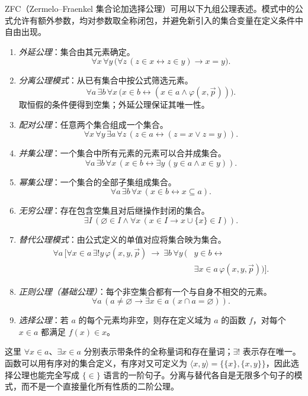 \documentclass[lang=cn,a4paper,fontset=none,zihao=false,10pt,openany,twoside]{beautybook}
\numberwithin{algorithm}{chapter}
\begin{document}
\begin{axiom}[ZFC 公理]
ZFC（Zermelo--Fraenkel 集合论加选择公理）可用以下九组公理表述。模式中的公式允许有额外参数，均对参数取全称闭包，并避免新引入的集合变量在定义条件中自由出现。
\begin{enumerate}[(1)]
\item \emph{外延公理}：集合由其元素确定。
\[
 \forall x\,\forall y\,
 \bigl(\forall z\,(z\in x\leftrightarrow z\in y)\to x=y\bigr).
\]
\item \emph{分离公理模式}：从已有集合中按公式筛选元素。
\[
 \forall a\,\exists b\,\forall x\,
 \bigl(x\in b\leftrightarrow(x\in a\wedge\varphi(x,\vec p))\bigr).
\]
取恒假的条件便得到空集；外延公理保证其唯一性。
\item \emph{配对公理}：任意两个集合组成一个集合。
\[
 \forall x\,\forall y\,\exists a\,\forall z\,
 (z\in a\leftrightarrow(z=x\vee z=y)).
\]
\item \emph{并集公理}：一个集合中所有元素的元素可以合并成集合。
\[
 \forall a\,\exists b\,\forall x\,
 (x\in b\leftrightarrow\exists y\,(y\in a\wedge x\in y)).
\]
\item \emph{幂集公理}：一个集合的全部子集组成集合。
\[
 \forall a\,\exists b\,\forall x\,(x\in b\leftrightarrow x\subseteq a).
\]
\item \emph{无穷公理}：存在包含空集且对后继操作封闭的集合。
\[
 \exists I\,(\varnothing\in I\wedge
 \forall x\,(x\in I\to x\cup\{x\}\in I)).
\]
\item \emph{替代公理模式}：由公式定义的单值对应将集合映为集合。
\[
 \begin{aligned}
 \forall a\,\bigl[\forall x\in a\,\exists!y\,\varphi(x,y,\vec p)
 \ \to\ \exists b\,\forall y\,(&y\in b\leftrightarrow\\
 &\exists x\in a\,\varphi(x,y,\vec p))\bigr].
 \end{aligned}
\]
\item \emph{正则公理（基础公理）}：每个非空集合都有一个与自身不相交的元素。
\[
 \forall a\,(a\ne\varnothing\to\exists x\in a\,(x\cap a=\varnothing)).
\]
\item \emph{选择公理}：若 $a$ 的每个元素均非空，则存在定义域为 $a$ 的函数 $f$，对每个 $x\in a$ 都满足 $f(x)\in x$。
\end{enumerate}
\end{axiom}
这里 $\forall x\in a$、$\exists x\in a$ 分别表示带条件的全称量词和存在量词；$\exists!$ 表示存在唯一。函数可以用有序对的集合定义，有序对又可定义为 $\langle x,y\rangle=\{\{x\},\{x,y\}\}$，因此选择公理也能完全写成 $\{\in\}$ 语言的一阶句子。分离与替代各自是无限多个句子的模式，而不是一个直接量化所有性质的二阶公理。
\end{document}
